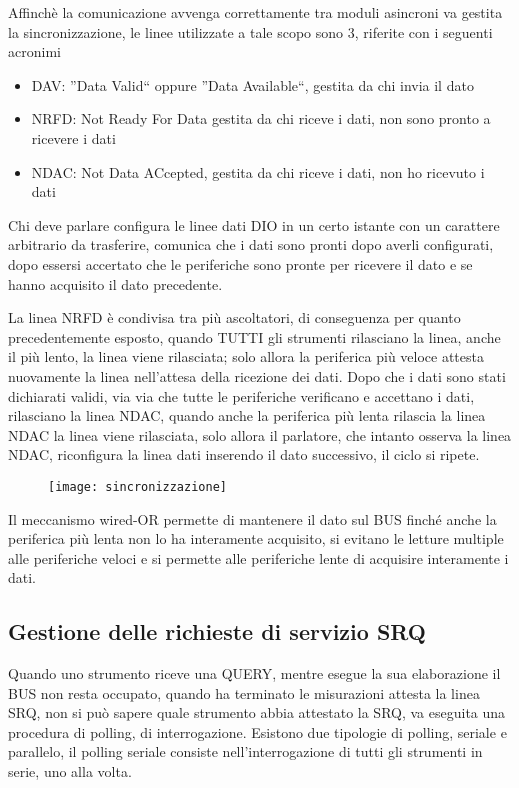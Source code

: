 Affinchè la comunicazione avvenga correttamente tra moduli asincroni va gestita
la sincronizzazione, le linee utilizzate a tale scopo sono 3, riferite con i
seguenti acronimi
\begin{itemize}
 \item DAV: ''Data Valid`` oppure ''Data Available``, gestita da chi invia il
dato
 \item NRFD: Not Ready For Data gestita da chi riceve i dati, non sono pronto a
ricevere i dati
 \item NDAC: Not Data ACcepted, gestita da chi riceve i dati, non ho ricevuto i
dati
\end{itemize}

Chi deve parlare configura le linee dati DIO in un certo istante con un
carattere arbitrario da trasferire, comunica che i dati sono pronti dopo averli
configurati, dopo essersi accertato che le periferiche sono pronte per ricevere
il dato e se hanno acquisito il dato precedente.

La linea NRFD è condivisa tra più ascoltatori, di conseguenza per quanto
precedentemente esposto, quando TUTTI gli strumenti rilasciano la linea, anche
il più lento, la linea viene rilasciata; solo allora la periferica più veloce
attesta nuovamente la linea nell'attesa della ricezione dei dati. Dopo che i
dati sono stati dichiarati validi, via via che tutte le periferiche verificano
e accettano i dati, rilasciano la linea NDAC, quando anche la periferica più
lenta rilascia la linea NDAC la linea viene rilasciata, solo allora il
parlatore, che intanto osserva la linea NDAC, riconfigura la linea dati
inserendo il dato successivo, il ciclo si ripete.

\begin{figure}[h]
\centering
\texttt{[image: sincronizzazione]}
\end{figure}
Il meccanismo wired-OR permette di mantenere il dato sul BUS finché anche la
periferica più lenta non lo ha interamente acquisito, si evitano le letture
multiple alle periferiche veloci e si permette alle periferiche lente di
acquisire interamente i dati.


\subsection{Gestione delle richieste di servizio SRQ}
Quando uno strumento riceve una QUERY, mentre esegue la sua elaborazione il BUS
non resta occupato, quando ha terminato le misurazioni attesta la linea SRQ,
non si può sapere quale strumento abbia attestato la SRQ, va eseguita una
procedura di polling, di interrogazione. Esistono due tipologie di polling,
seriale e parallelo, il polling seriale consiste nell'interrogazione di tutti
gli strumenti in serie, uno alla volta.

